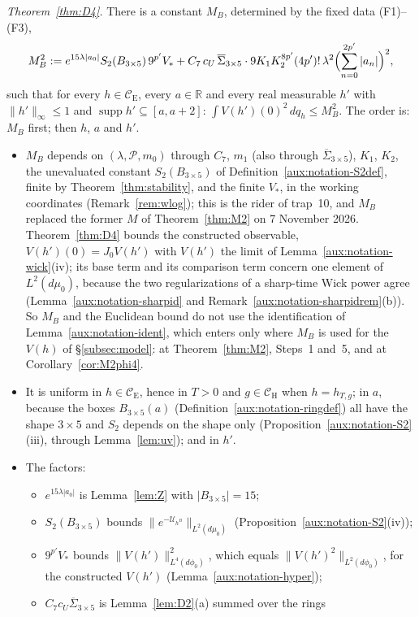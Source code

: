 \documentclass[11pt,a4paper]{article}
\theoremstyle{plain}
\theoremstyle{definition}
\theoremstyle{plain}
\theoremstyle{definition}
\newcommand{\R}{\mathbb{R}}
\newcommand{\CE}{\mathcal{C}_{\mathrm E}}
\newcommand{\CH}{\mathcal{C}_{\mathrm H}}
\DeclareMathOperator{\supp}{supp}
\newcommand{\Uc}{\mathcal U}
\newcommand{\dmu}{d\mu_0}
\begin{document}
\emph{Theorem~\ref{thm:D4}.} There is a constant $M_B$, determined by the fixed data
(F1)--(F3),
\[
 M_B^2:=e^{15\lambda|a_0|}S_2(B_{3\times5})\,9^{p'}V_*
 +C_7\,c_U\,\overline\Sigma_{3\times5}\cdot9K_1K_2^{8p'}(4p')!\,\lambda^2
 \Bigl(\sum_{n=0}^{2p'}|a_n|\Bigr)^2,
\]
such that for every $h\in\CE$, every $a\in\R$ and every real measurable $h'$ with
$\|h'\|_\infty\le1$ and $\supp h'\subseteq[a,a+2]$: $\int V(h')(0)^2\,dq_h\le M_B^2$. The order
is: $M_B$ first; then $h$, $a$ and $h'$.
\begin{itemize}
\item $M_B$ depends on $(\lambda,\mathscr P,m_0)$ through $C_7$, $m_1$ (also through
$\overline\Sigma_{3\times5}$), $K_1$, $K_2$, the unevaluated constant $S_2(B_{3\times5})$ of
Definition~\ref{aux:notation-S2def}, finite by Theorem~\ref{thm:stability}, and the finite
$V_*$, in the working coordinates
(Remark~\ref{rem:wlog}); this is the rider of trap~10, and $M_B$ replaced the former $M$ of
Theorem~\ref{thm:M2} on 7 November 2026.  Theorem~\ref{thm:D4} bounds the constructed observable,
$V(h')(0)=J_0V(h')$ with $V(h')$ the limit of Lemma~\ref{aux:notation-wick}(iv); its base term
and its comparison term concern one element of $L^2(\dmu)$, because the two regularizations of a
sharp-time Wick power agree (Lemma~\ref{aux:notation-sharpid} and
Remark~\ref{aux:notation-sharpidrem}(b)).  So $M_B$ and the Euclidean bound do not use the identification of
Lemma~\ref{aux:notation-ident}, which enters only where $M_B$ is used for the $V(h)$ of
\S\ref{subsec:model}: at Theorem~\ref{thm:M2}, Steps~1 and~5, and at Corollary~\ref{cor:M2phi4}.
\item It is uniform in $h\in\CE$, hence in $T>0$ and $g\in\CH$ when $h=h_{T,g}$; in $a$,
because the boxes $B_{3\times5}(a)$ (Definition~\ref{aux:notation-ringdef}) all have the shape
$3\times5$ and $S_2$ depends on the shape only (Proposition~\ref{aux:notation-S2}(iii), through
Lemma~\ref{lem:uv}); and in $h'$.
\item The factors:
\begin{itemize}
\item $e^{15\lambda|a_0|}$ is Lemma~\ref{lem:Z} with $|B_{3\times5}|=15$;
\item $S_2(B_{3\times5})$ bounds $\|e^{-\Uc_{h^B}}\|_{L^2(\dmu)}$
(Proposition~\ref{aux:notation-S2}(iv));
\item $9^{p'}V_*$ bounds $\|V(h')\|_{L^4(d\phi_0)}^2$, which equals
$\|V(h')^2\|_{L^2(d\phi_0)}$, for the constructed $V(h')$ (Lemma~\ref{aux:notation-hyper});
\item $C_7c_U\overline\Sigma_{3\times5}$ is Lemma~\ref{lem:D2}(a) summed over the rings

\end{itemize}
\end{itemize}
\end{document}
